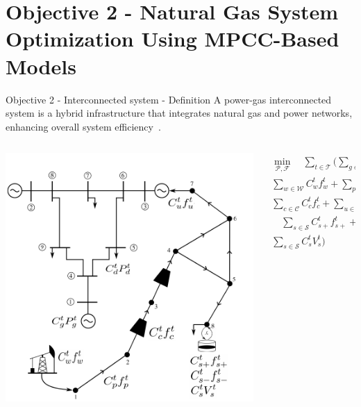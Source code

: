 \documentclass[hyperref={colorlinks,citecolor=blue,linkcolor=blue,urlcolor=blue}]{beamer}
\begin{document}
\section{Objective 2 - Natural Gas System Optimization Using MPCC-Based Models}
\begin{frame}{Objective 2 - Interconnected system - Definition}
A power-gas interconnected system is a hybrid infrastructure that integrates natural gas and power networks, enhancing overall system efficiency~\cite{Duan_Liu_Yang_2022}. 
\begin{columns}
\begin{column}{0.5\textwidth}
   \begin{center}
     \includegraphics[width=1\textwidth]{figures/network_math_alternative.pdf}
     \end{center}
\end{column}
\begin{column}{0.5\textwidth}  
\begin{equation} \label{eq:obj_func_integrated}
\begin{split}
 \min_{\mathcal{P}, \mathcal{F}} \quad  \sum_{t \in \mathcal{T}} (   \sum_{g \in \mathcal{G}} C_{g}^t {P_{g}^t} + \sum_{d \in \mathcal{D}} C_{d}^t {P_{d}^t} +  \\ \sum_{w \in \mathcal{W}} C_{w}^t {f_{w}^t} +  \sum_{p \in \mathcal{P}} C_{p}^t {f_{p}^t}  + \\ \sum_{c \in \mathcal{C}} C_{c}^t {f_{c}^t} + \sum_{u \in \mathcal{U}} C_{u}^{t} {f_{u}^{t}} + \\ \quad \sum_{s \in \mathcal{S}} C_{s+}^{t} {f_{s+}^{t}}  + \sum_{s \in \mathcal{S}} C_{s-}^{t} {f_{s-}^{t}} + \\ \sum_{s \in \mathcal{S}} C_{s}^{t} {V_{s}^{t}} )
\end{split}
\end{equation} 
\end{column}
\end{columns}
\end{frame}
\end{document}

